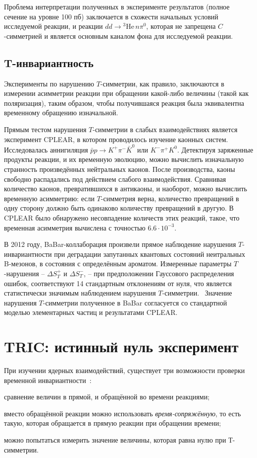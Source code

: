 \documentclass[14pt]{extarticle}
\begin{document}
Проблема интерпретации полученных в эксперименте результатов (полное сечение на уровне 100 пб) заключается в схожести начальных условий исследуемой реакции, и реакции $dd \to {^3}\mathrm{He}\,n\pi^0$, которая не запрещена $C$-симметрией и является основным каналом фона для исследуемой реакции. 

\subsection{T-инвариантность}

Эксперименты по нарушению $T$-симметрии, как правило, заключаются в измерении асимметрии реакции при обращении какой-либо величины (такой как поляризация), таким образом, чтобы получившаяся реакция была эквивалентна временному обращению изначальной.

Прямым тестом нарушения $T$-симметрии в слабых взаимодействиях является эксперимент CPLEAR, в котором проводилось изучение каонных систем.~\cite{CPLEAR} Исследовалась аннигиляция $\bar{p}p \to K^+ \pi^- \bar{K}^0$ или $K^- \pi^+ K^0$. Детектируя заряженные продукты реакции, и их временную эволюцию, можно вычислить изначальную странность произведённых нейтральных каонов. После производства, каоны свободно распадались под действием слабого взаимодействия. Сравнивая количество каонов, превратившихся в антикаоны, и наоборот, можно вычислить временную асимметрию: если $T$-симметрия верна, количество превращений в одну сторону должно быть одинаково количеству превращений в другую.
%
В CPLEAR было обнаружено несовпадение количеств этих реакций, такое, что временная асимметрия вычислена с точностью $6.6\cdot 10^{-3}$.

В 2012 году, BaBar-коллаборация произвели прямое наблюдение нарушения $T$- инвариантности при деградации запутанных квантовых состояний неитральных B-мезонов, в состояния с определённым ароматом. Измеренные параметры $T$-нарушения -- $\Delta S_T^+$ и $\Delta S_T^-$, -- при предположении Гауссового распределения ошибок, соответствуют 14 стандартным отклонениям от нуля, что является статистически значимым наблюдением нарушения $T$-симметрии.~\cite{BaBar} Значение нарушения $T$-симметрии полученное в BaBar согласуется со стандартной моделью элементарных частиц и результатами CPLEAR.

\section{TRIC: истинный нуль эксперимент}

При изучении ядерных взаимодействий, существует три возможности проверки временной инвариантности~\cite{Goldstein}:
\begin{inparaenum}[i)]
	\item сравнение величин в прямой, и обращённой во времени реакциями;
	\item вместо обращённой реакции можно использовать \emph{время-сопряжённую}, то есть такую, которая обращается в прямую реакции при обращении времени;
	\item можно попытаться измерить значение величины, которая равна нулю при Т-симметрии.
\end{inparaenum}
\end{document}
